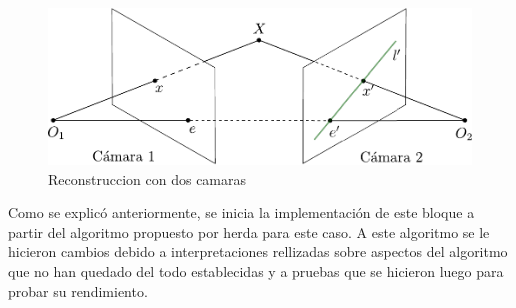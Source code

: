 \begin{figure}[h!]
\begin{center}
\includegraphics[scale=0.5]{img/Reconstruccion/geometria_epipolar.pdf}
\end{center}
\caption{Reconstruccion con dos camaras}
\label{pinhole_camara}
\end{figure}

Como se explicó anteriormente, se inicia la implementación de este bloque a partir del algoritmo propuesto por herda para este caso. A este algoritmo se le hicieron cambios debido a interpretaciones rellizadas sobre aspectos del algoritmo que no han quedado del todo establecidas y a pruebas que se hicieron luego  para probar su rendimiento.\\


